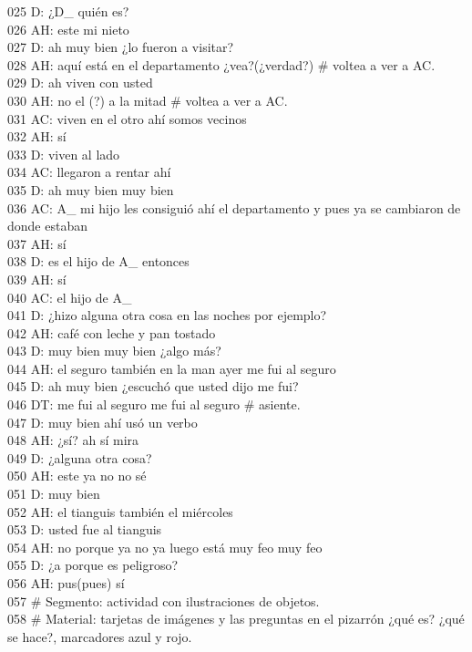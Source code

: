 025 D: ¿D\_ quién es?\\
026 AH: este mi nieto\\
027 D: ah muy bien ¿lo fueron a visitar?\\
028 AH: aquí está en el departamento ¿vea?(¿verdad?) \# voltea a ver a AC.\\
029 D: ah viven con usted\\
030 AH: no el (?) a la mitad \# voltea a ver a AC.\\
031 AC: viven en el otro ahí somos vecinos\\
032 AH: sí\\
033 D: viven al lado\\
034 AC: llegaron a rentar ahí\\
035 D: ah muy bien muy bien\\
036 AC: A\_ mi hijo les consiguió ahí el departamento y pues ya se cambiaron de donde estaban\\
037 AH: sí\\
038 D: es el hijo de A\_ entonces\\
039 AH: sí\\
040 AC: el hijo de A\_\\
041 D: ¿hizo alguna otra cosa en las noches por ejemplo?\\
042 AH: café con leche y pan tostado\\
043 D: muy bien muy bien ¿algo más?\\
044 AH: el seguro también en la man ayer me fui al seguro\\
045 D: ah muy bien ¿escuchó que usted dijo me fui?\\
046 DT: me fui al seguro me fui al seguro \# asiente.\\
047 D: muy bien ahí usó un verbo\\
048 AH: ¿sí? ah sí mira\\
049 D: ¿alguna otra cosa?\\
050 AH: este ya no no sé\\
051 D: muy bien\\
052 AH: el tianguis también el miércoles\\
053 D: usted fue al tianguis\\
054 AH: no porque ya no ya luego está muy feo muy feo\\
055 D: ¿a porque es peligroso?\\
056 AH: pus(pues) sí\\
057 \# Segmento: actividad con ilustraciones de objetos.\\
058 \# Material: tarjetas de imágenes y las preguntas en el pizarrón ¿qué es? ¿qué se hace?, marcadores azul y rojo. \\

